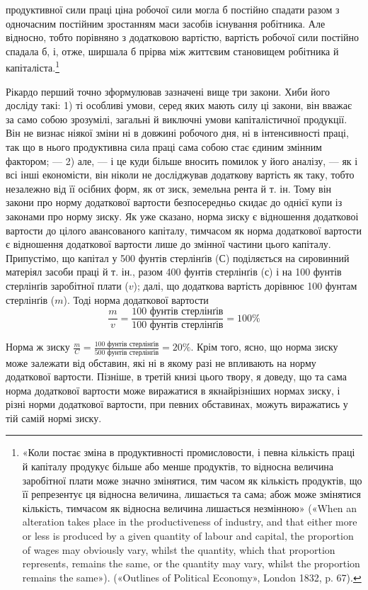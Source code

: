 \parcont{}  %
продуктивної сили праці ціна робочої сили могла б постійно
спадати разом з одночасним постійним зростанням маси засобів
існування робітника. Але відносно, тобто порівняно з додатковою
вартістю, вартість робочої сили постійно спадала б, і, отже,
ширшала б прірва між життєвим становищем робітника й капіталіста.\footnote{
«Коли постає зміна в продуктивності промисловости, і певна
кількість праці й капіталу продукує більше або менше продуктів, то
відносна величина заробітної плати може значно змінятися, тим часом як
кількість продуктів, що її репрезентує ця відносна величина, лишається
та сама; абож може змінятися кількість, тимчасом як відносна
величина лишається незмінною» («When an alteration takes place in the productiveness
of industry, and that either more or less is produced by a given
quantity of labour and capital, the proportion of wages may obviously
vary, whilst the quantity, which that proportion represents, remains the
same, or the quantity may vary, whilst the proportion remains the same»).
(«Outlines of Political Economy», London 1832, p. 67).
}

Рікардо перший точно зформулював зазначені вище три закони.
Хиби його досліду такі: 1) ті особливі умови, серед яких
мають силу ці закони, він вважає за само собою зрозумілі, загальні
й виключні умови капіталістичної продукції. Він не визнає
ніякої зміни ні в довжині робочого дня, ні в інтенсивності
праці, так що в нього продуктивна сила праці сама собою стає
єдиним змінним фактором; — 2) але, — і це куди більше вносить
помилок у його аналізу, — як і всі інші економісти, він ніколи
не досліджував додаткову вартість як таку, тобто незалежно
від її осібних форм, як от зиск, земельна рента й т. ін. Тому
він закони про норму додаткової вартости безпосередньо скидає
до однієї купи із законами про норму зиску. Як уже сказано,
норма зиску є відношення додатковоі вартости до цілого
авансованого капіталу, тимчасом як норма додаткової вартости
є відношення додаткової вартости лише до змінної частини
цього капіталу. Припустімо, що капітал у 500 фунтів стерлінґів
($С$) поділяється на сировинний матеріял засоби праці й т. ін.,
разом 400 фунтів стерлінґів ($с$) і на 100 фунтів стерлінґів заробітної
плати ($v$); далі, що додаткова вартість дорівнює 100 фунтам
стерлінґів ($m$). Тоді норма додаткової вартости\[
   \frac{m}{v} = \frac{100\text{ фунтів стерлінґів}}{100\text{ фунтів стерлінґів}} = 100\%
\]

Норма ж зиску $ \frac{m}{C} = \frac{100\text{ фунтів стерлінґів}}{500\text{ фунтів стерлінґів}} = 20\%$. Крім того,
ясно, що норма зиску може залежати від обставин, які ні в якому
разі не впливають на норму додаткової вартости. Пізніше, в
третій книзі цього твору, я доведу, що та сама норма додаткової
вартости може виражатися в якнайрізніших нормах зиску, і
різні норми додаткової вартости, при певних обставинах, можуть
виражатись у тій самій нормі зиску.
